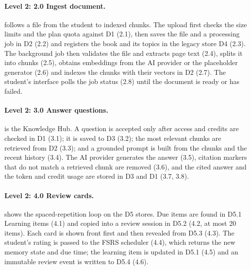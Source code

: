 
\paragraph{Level 2: 2.0 Ingest document.}  follows a file from the
student to indexed chunks. The upload first checks the size limits and the plan quota
against D1 (2.1), then saves the file and a processing job in D2 (2.2) and registers the
book and its topics in the legacy store D4 (2.3). The background job then validates the
file and extracts page text (2.4), splits it into chunks (2.5), obtains embeddings from
the AI provider or the placeholder generator (2.6) and indexes the chunks with their
vectors in D2 (2.7). The student's interface polls the job status (2.8) until the
document is ready or has failed.


\paragraph{Level 2: 3.0 Answer questions.}  is the Knowledge Hub.
A question is accepted only after access and credits are checked in D1 (3.1); it is
saved to D3 (3.2); the most relevant chunks are retrieved from D2 (3.3); and a grounded
prompt is built from the chunks and the recent history (3.4). The AI provider generates
the answer (3.5), citation markers that do not match a retrieved chunk are removed
(3.6), and the cited answer and the token and credit usage are stored in D3 and D1
(3.7, 3.8).


\paragraph{Level 2: 4.0 Review cards.}  shows the spaced-repetition
loop on the D5 stores. Due items are found in D5.1 Learning items (4.1) and copied into
a review session in D5.2 (4.2, at most 20 items). Each card is shown front first and
then revealed from D5.3 (4.3). The student's rating is passed to the FSRS scheduler
(4.4), which returns the new memory state and due time; the learning item is updated in
D5.1 (4.5) and an immutable review event is written to D5.4 (4.6).

